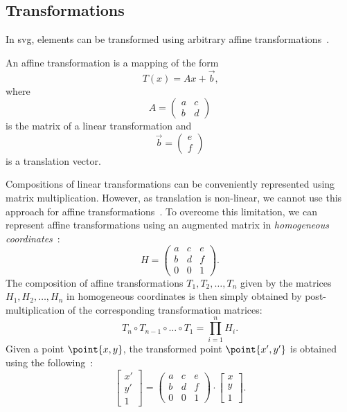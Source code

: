\subsection{Transformations}\label{theo:transformations}

In \gls{svg}, elements can be transformed using arbitrary affine transformations~\cite[Sec.~7]{svg11}.

\begin{definition}
    An affine transformation is a mapping of the form
    \[
        T(x) = Ax + \vec{b}\text{,}
    \]
    where
    \[
        A =
        \begin{pmatrix}
            a & c \\
            b & d
        \end{pmatrix}
    \]
    is the matrix of a linear transformation and
    \[
        \vec{b} =
        \begin{pmatrix}
            e \\
            f
        \end{pmatrix}
    \]
    is a translation vector.
\end{definition}

Compositions of linear transformations can be conveniently represented using matrix multiplication. However, as translation is non-linear, we cannot use this approach for affine transformations~\cite[Sec.~1.2.1]{salomon2006transformations}. To overcome this limitation, we can represent affine transformations using an augmented matrix in \emph{homogeneous coordinates}~\cite{salomon2006transformations}:
\[
    H =
    \begin{pmatrix}
        a & c & e \\
        b & d & f \\
        0 & 0 & 1
    \end{pmatrix}
    \text{.}
\]
The composition of affine transformations $T_1,T_2,\ldots,T_n$ given by the matrices $H_1,H_2,\ldots,H_n$ in homogeneous coordinates is then simply obtained by post-multiplication of the corresponding transformation matrices:
\[
    T_n \circ T_{n-1} \circ \ldots \circ T_1 = \prod_{i = 1}^n{H_i}\text{.}
\]
Given a point $\point{x, y}$, the transformed point $\point{x', y'}$ is obtained using the following~\cites[Sec.~7.4]{svg11}[Sec.~1.2.1]{salomon2006transformations}:
\[
    \begin{bmatrix}
        x' \\
        y' \\
        1
    \end{bmatrix}
    =
    \begin{pmatrix}
        a & c & e \\
        b & d & f \\
        0 & 0 & 1
    \end{pmatrix}
    \cdot
    \begin{bmatrix}
        x \\
        y \\
        1
    \end{bmatrix}
    \text{.}
\]

